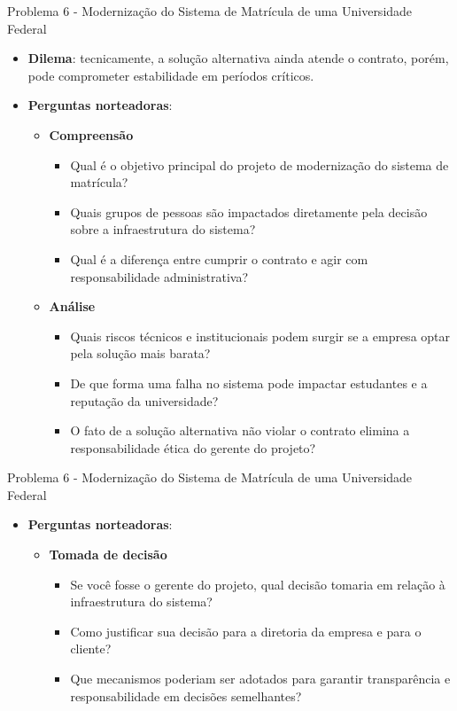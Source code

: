 \documentclass{beamer}
\begin{document}
\begin{frame}{Problema 6 - Modernização do Sistema de Matrícula de uma Universidade Federal}
	\begin{itemize}
		\justifying
		\item \textbf{Dilema}: tecnicamente, a solução alternativa ainda atende o contrato, porém, pode comprometer estabilidade em períodos críticos.
		\item \textbf{Perguntas norteadoras}:
		\begin{itemize}
			\item \textbf{Compreensão}
				\begin{itemize}
					\justifying
					\item Qual é o objetivo principal do projeto de modernização do sistema de matrícula?
					\item Quais grupos de pessoas são impactados diretamente pela decisão sobre a infraestrutura do sistema?
					\item Qual é a diferença entre cumprir o contrato e agir com responsabilidade administrativa?
				\end{itemize}
			\item \textbf{Análise}
				\begin{itemize}
					\justifying
					\item Quais riscos técnicos e institucionais podem surgir se a empresa optar pela solução mais barata?
					\item De que forma uma falha no sistema pode impactar estudantes e a reputação da universidade?
					\item O fato de a solução alternativa não violar o contrato elimina a responsabilidade ética do gerente do projeto?
				\end{itemize}
		\end{itemize}
	\end{itemize}
\end{frame}

\begin{frame}{Problema 6 - Modernização do Sistema de Matrícula de uma Universidade Federal}
	\begin{itemize}
		\justifying
		\item \textbf{Perguntas norteadoras}:
		\begin{itemize}
			\item \textbf{Tomada de decisão}
			\begin{itemize}
				\justifying
				\item Se você fosse o gerente do projeto, qual decisão tomaria em relação à infraestrutura do sistema?
				\item Como justificar sua decisão para a diretoria da empresa e para o cliente?
				\item Que mecanismos poderiam ser adotados para garantir transparência e responsabilidade em decisões semelhantes?
			\end{itemize}
		\end{itemize}
	\end{itemize}
\end{frame}
\end{document}
